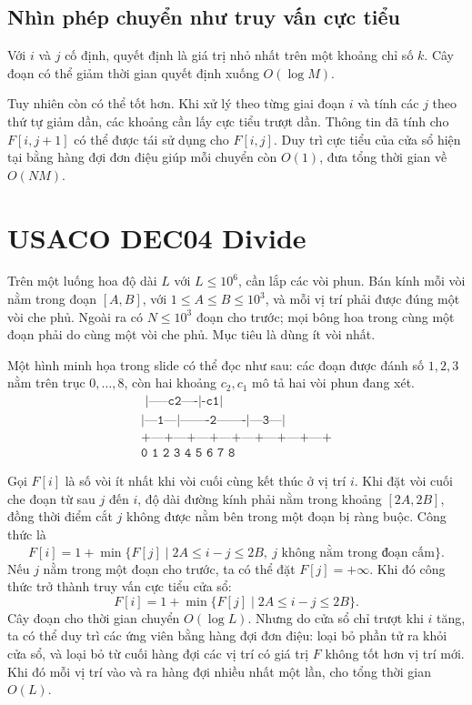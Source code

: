 \documentclass[11pt]{article}
\begin{document}
\subsection*{Nhìn phép chuyển như truy vấn cực tiểu}

Với $i$ và $j$ cố định, quyết định là giá trị nhỏ nhất trên một khoảng chỉ số
$k$. Cây đoạn có thể giảm thời gian quyết định xuống $O(\log M)$.

Tuy nhiên còn có thể tốt hơn. Khi xử lý theo từng giai đoạn $i$ và tính các
$j$ theo thứ tự giảm dần, các khoảng cần lấy cực tiểu trượt dần. Thông tin đã
tính cho $F[i,j+1]$ có thể được tái sử dụng cho $F[i,j]$. Duy trì cực tiểu
của cửa sổ hiện tại bằng hàng đợi đơn điệu giúp mỗi chuyển còn $O(1)$, đưa
tổng thời gian về $O(NM)$.

\section{USACO DEC04 Divide}

Trên một luống hoa độ dài $L$ với $L\le 10^6$, cần lắp các vòi phun. Bán kính
mỗi vòi nằm trong đoạn $[A,B]$, với $1\le A\le B\le 10^3$, và mỗi vị trí phải
được đúng một vòi che phủ. Ngoài ra có $N\le 10^3$ đoạn cho trước; mọi bông
hoa trong cùng một đoạn phải do cùng một vòi che phủ. Mục tiêu là dùng ít vòi
nhất.

Một hình minh họa trong slide có thể đọc như sau: các đoạn được đánh số
$1,2,3$ nằm trên trục $0,\ldots,8$, còn hai khoảng $c_2,c_1$ mô tả hai vòi
phun đang xét.
\[
\begin{array}{c}
\texttt{        |-----c2----|-c1|}\\
\texttt{|---1---|-------2-------|---3---|}\\
\texttt{+---+---+---+---+---+---+---+---+}\\
\texttt{0   1   2   3   4   5   6   7   8}
\end{array}
\]

Gọi $F[i]$ là số vòi ít nhất khi vòi cuối cùng kết thúc ở vị trí $i$. Khi đặt
vòi cuối che đoạn từ sau $j$ đến $i$, độ dài đường kính phải nằm trong khoảng
$[2A,2B]$, đồng thời điểm cắt $j$ không được nằm bên trong một đoạn bị ràng
buộc. Công thức là
\[
  F[i]=1+\min\{F[j]\mid 2A\le i-j\le 2B,\ j
  \text{ không nằm trong đoạn cấm}\}.
\]
Nếu $j$ nằm trong một đoạn cho trước, ta có thể đặt $F[j]=+\infty$. Khi đó
công thức trở thành truy vấn cực tiểu cửa sổ:
\[
  F[i]=1+\min\{F[j]\mid 2A\le i-j\le 2B\}.
\]
Cây đoạn cho thời gian chuyển $O(\log L)$. Nhưng do cửa sổ chỉ trượt khi $i$
tăng, ta có thể duy trì các ứng viên bằng hàng đợi đơn điệu: loại bỏ phần tử
ra khỏi cửa sổ, và loại bỏ từ cuối hàng đợi các vị trí có giá trị $F$ không
tốt hơn vị trí mới. Khi đó mỗi vị trí vào và ra hàng đợi nhiều nhất một lần,
cho tổng thời gian $O(L)$.
\end{document}
